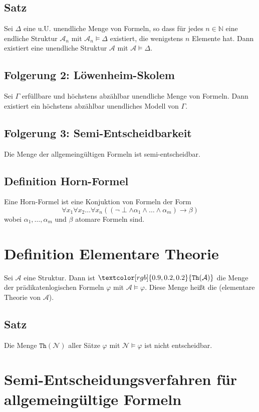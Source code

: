 \documentclass[12pt,a4paper]{report}
\newcommand{\ra}{\rightarrow}
\newcommand{\ls}{\newline\newline}
\newcommand{\red}[1]{\textcolor[rgb]{0.9,0.2,0.2}{#1}}
\newcommand{\green}[1]{\textcolor[rgb]{0.1,0.6,0.1}{#1}}
\newcommand{\blue}[1]{\textcolor[rgb]{0.2,0.2,1}{#1}}
\begin{document}
\subsection{\green{Satz}}
Sei $ \Delta $ eine u.U. unendliche Menge von Formeln, so dass für jedes $ n \in \mathbb{N} $ eine endliche Struktur $ \mathcal{A}_n $ mit $ \mathcal{A}_n \vDash \Delta $ existiert, die wenigstens $ n $ Elemente hat.\ls
Dann existiert eine unendliche Struktur $ \mathcal{A} $ mit $ \mathcal{A} \vDash \Delta $.
\subsection{\green{Folgerung 2: Löwenheim-Skolem}}
Sei $ \Gamma $ erfüllbare und höchstens abzählbar unendliche Menge von Formeln. Dann existiert ein höchstens abzählbar unendliches Modell von $ \Gamma $.
\subsection{\green{Folgerung 3: Semi-Entscheidbarkeit}}
Die Menge der allgemeingültigen Formeln ist semi-entscheidbar.

\subsection{\blue{Definition Horn-Formel}}
Eine \red{Horn-Formel} ist eine Konjuktion von Formeln der Form
\[
    \forall x_1 \forall x_2 \dots \forall x_n ((\lnot\perp \wedge \alpha_1 \wedge\dots \wedge \alpha_m) \ra \beta)
\]
wobei $ \alpha_1,\dots,\alpha_m  $ und $ \beta $ atomare Formeln sind.

\section{\blue{Definition Elementare Theorie}}
Sei $ \mathcal{A} $ eine Struktur. Dann ist $ \red{\texttt{Th}(\mathcal{A})} $ die Menge der prädikatenlogischen Formeln $ \varphi $ mit $ \mathcal{A} \vDash \varphi $. Diese Menge heißt die \red{(elementare Theorie von $ \mathcal{A} $)}.
\subsection{\green{Satz}}
Die Menge $ \texttt{Th}(\mathcal{N}) $ aller Sätze $ \varphi $ mit $ \mathcal{N} \vDash \varphi $ ist nicht entscheidbar.

\section{\red{Semi-Entscheidungsverfahren für allgemeingültige Formeln}}
\end{document}
